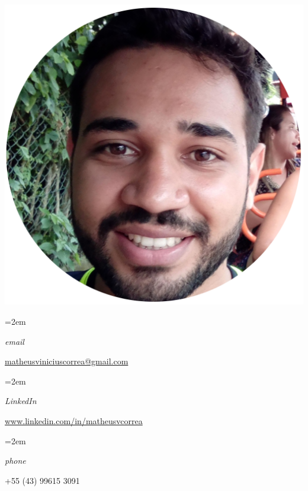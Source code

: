 \documentclass[fontsize=14pt,paper=a4]{scrartcl}
\date{} %
\newcommand{\ProfileInfo}[2]{\noindent\hangindent=2em\hangafter=0
  \parbox{5em}{\small \textit{#1}\hspace{1em}} {\small #2}}
\begin{document}
\pagestyle{scrheadings}


\begin{cv}{%
    \noindent%
    \begin{minipage}{.68\textwidth}%
    \end{minipage}%
    \hfill%
    \begin{minipage}{.30\textwidth}%
      \begin{flushright}%
        \includegraphics[clip,width=0.6\linewidth]{profile-pic-croped}
      \end{flushright}%
    \end{minipage}%
  }\vspace{-.7em}
  

  \vspace{.5em}

  \ProfileInfo{email}{\href{mailto:matheusviniciuscorrea@gmail.com}{matheusviniciuscorrea@gmail.com}}

  \ProfileInfo{LinkedIn}{\href{https://www.linkeding.com/in/matheusvcorrea}{www.linkedin.com/in/matheusvcorrea}}

  \ProfileInfo{phone}{+55 (43) 99615 3091}
  
  \vspace{1em}


\end{cv}
\end{document}
